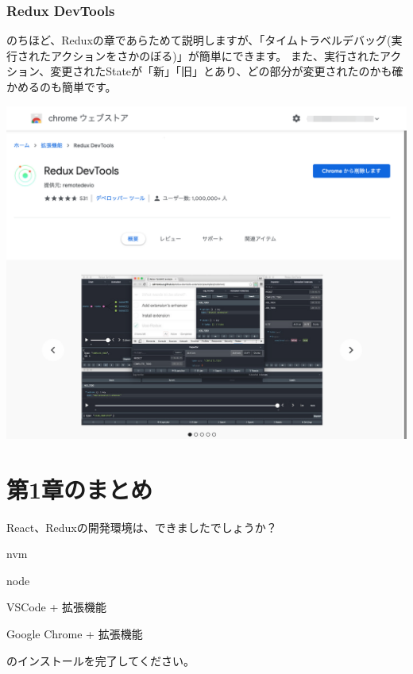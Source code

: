 \clearpage


\subsubsection*{Redux DevTools}
\keeplastskip{
  \label{sec:1-3-1-3}
  \par\nobreak
}

のちほど、Reduxの章であらためて説明しますが、「タイムトラベルデバッグ(実行されたアクションをさかのぼる)」が簡単にできます。
また、実行されたアクション、変更されたStateが「新」「旧」とあり、どの部分が変更されたのかも確かめるのも簡単です。

\begin{reviewimage}[H]%
\includegraphics[width=1.0\maxwidth]{./images/01-createDevEnv/01_11chromeExtReduxDevTools.png}%
\label{image:01-createDevEnv:01_11chromeExtReduxDevTools}
\end{reviewimage}

\section{第1章のまとめ}
\keeplastskip{
  \label{sec:1-4}
  \label{sec-chap01review}
  \par\nobreak
}

React、Reduxの開発環境は、できましたでしょうか？

\begin{starteritemize}
\item nvm
\item node
\item VSCode + 拡張機能
\item Google Chrome + 拡張機能
\end{starteritemize}

のインストールを完了してください。
